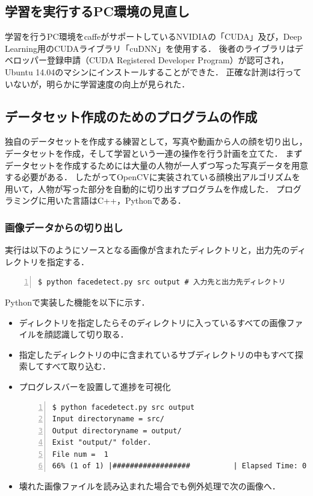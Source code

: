 \documentclass[a4paper,10pt]{jsarticle}
\begin{document}
\subsection{学習を実行するPC環境の見直し}
学習を行うPC環境をcaffeがサポートしているNVIDIAの「CUDA」及び，Deep Learning用のCUDAライブラリ「cuDNN」を使用する．
後者のライブラリはデベロッパー登録申請（CUDA Registered Developer Program）が認可され，Ubuntu 14.04のマシンにインストールすることができた．
正確な計測は行っていないが，明らかに学習速度の向上が見られた．

\subsection{データセット作成のためのプログラムの作成}
独自のデータセットを作成する練習として，写真や動画から人の顔を切り出し，データセットを作成，そして学習という一連の操作を行う計画を立てた．
まずデータセットを作成するためには大量の人物が一人ずつ写った写真データを用意する必要がある．
したがってOpenCVに実装されている顔検出アルゴリズムを用いて，人物が写った部分を自動的に切り出すプログラムを作成した．
プログラミングに用いた言語はC++，Pythonである．

\subsubsection{画像データからの切り出し}
実行は以下のようにソースとなる画像が含まれたディレクトリと，出力先のディレクトリを指定する．

\begin{lstlisting}[basicstyle=\ttfamily\footnotesize, frame=single, firstnumber=1, numbers=left, breaklines=true]
$ python facedetect.py src output # 入力先と出力先ディレクトリ
\end{lstlisting}

Pythonで実装した機能を以下に示す．
\begin{itemize}
 \item ディレクトリを指定したらそのディレクトリに入っているすべての画像ファイルを顔認識して切り取る．
 \item 指定したディレクトリの中に含まれているサブディレクトリの中もすべて探索してすべて取り込む．
 \item プログレスバーを設置して進捗を可視化

\begin{lstlisting}[basicstyle=\ttfamily\footnotesize, frame=single, firstnumber=1, numbers=left, breaklines=true]
$ python facedetect.py src output
Input directoryname = src/
Output directoryname = output/
Exist "output/" folder.
File num =  1
66% (1 of 1) |##################          | Elapsed Time: 0:00:07 ETA:  0:04:26
\end{lstlisting}

 \item 壊れた画像ファイルを読み込まれた場合でも例外処理で次の画像へ．
\end{itemize}
\end{document}
